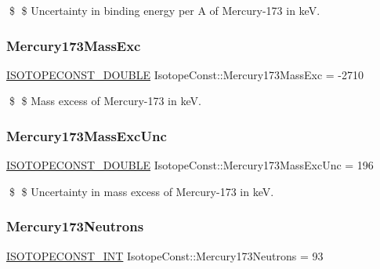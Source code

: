 \$ \$ Uncertainty in binding energy per A of Mercury-\/173 in keV. \mbox{\label{group___isotope_const-_mercury-_hg173_gae4c6f08b821379815966a0d0b54cb250}} 
\subsubsection{\texorpdfstring{Mercury173\+Mass\+Exc}{Mercury173MassExc}}
{\footnotesize\ttfamily \mbox{\hyperlink{group___isotope_const-_macros_ga8f45a7272ce02c0b4c65c44636ed719a}{I\+S\+O\+T\+O\+P\+E\+C\+O\+N\+S\+T\+\_\+\+D\+O\+U\+B\+LE}} Isotope\+Const\+::\+Mercury173\+Mass\+Exc = -\/2710}

\$ \$ Mass excess of Mercury-\/173 in keV. \mbox{\label{group___isotope_const-_mercury-_hg173_ga12df6aa3b60737bdbf558b81870a3588}} 
\subsubsection{\texorpdfstring{Mercury173\+Mass\+Exc\+Unc}{Mercury173MassExcUnc}}
{\footnotesize\ttfamily \mbox{\hyperlink{group___isotope_const-_macros_ga8f45a7272ce02c0b4c65c44636ed719a}{I\+S\+O\+T\+O\+P\+E\+C\+O\+N\+S\+T\+\_\+\+D\+O\+U\+B\+LE}} Isotope\+Const\+::\+Mercury173\+Mass\+Exc\+Unc = 196}

\$ \$ Uncertainty in mass excess of Mercury-\/173 in keV. \mbox{\label{group___isotope_const-_mercury-_hg173_ga604187fefb5f712418183260b21b351b}} 
\subsubsection{\texorpdfstring{Mercury173\+Neutrons}{Mercury173Neutrons}}
{\footnotesize\ttfamily \mbox{\hyperlink{group___isotope_const-_macros_ga5f18360b3e99483a35c32d789e62621c}{I\+S\+O\+T\+O\+P\+E\+C\+O\+N\+S\+T\+\_\+\+I\+NT}} Isotope\+Const\+::\+Mercury173\+Neutrons = 93}

